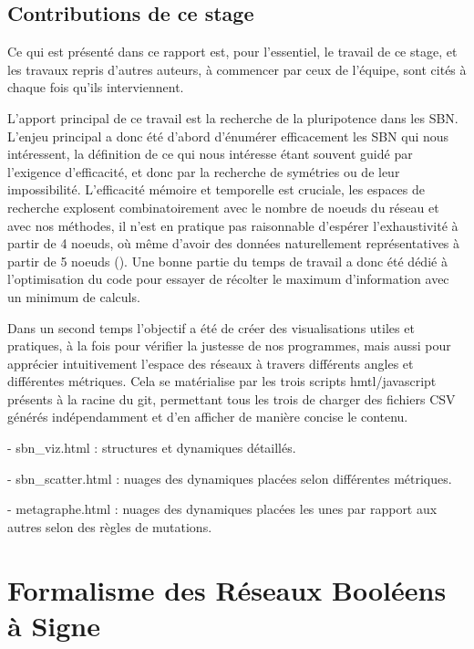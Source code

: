 \documentclass[12pt, a4paper]{article}
\begin{document}
\subsection{Contributions de ce stage}

Ce qui est présenté dans ce rapport est, pour l'essentiel, le travail de ce stage, et les travaux repris d'autres auteurs, à commencer par ceux de l'équipe, sont cités à chaque fois qu'ils interviennent.

L'apport principal de ce travail est la recherche de la pluripotence dans les SBN. L'enjeu principal a donc été d'abord d'énumérer efficacement les SBN qui nous intéressent, la définition de ce qui nous intéresse étant souvent guidé par l'exigence d'efficacité, et donc par la recherche de symétries ou de leur impossibilité. L'efficacité mémoire et temporelle est cruciale, les espaces de recherche explosent combinatoirement avec le nombre de noeuds du réseau et avec nos méthodes, il n'est en pratique pas raisonnable d'espérer l'exhaustivité à partir de 4 noeuds, où même d'avoir des données naturellement représentatives à partir de 5 noeuds (). Une bonne partie du temps de travail a donc été dédié à l'optimisation du code pour essayer de récolter le maximum d'information avec un minimum de calculs.  

Dans un second temps l'objectif a été de créer des visualisations utiles et pratiques, à la fois pour vérifier la justesse de nos programmes, mais aussi pour apprécier intuitivement l'espace des réseaux à travers différents angles et différentes métriques. Cela se matérialise par les trois scripts hmtl/javascript présents à la racine du git, permettant tous les trois de charger des fichiers CSV générés indépendamment et d'en afficher de manière concise le contenu. 

- sbn\_viz.html : structures et dynamiques détaillés.

- sbn\_scatter.html : nuages des dynamiques placées selon différentes métriques.

- metagraphe.html : nuages des dynamiques placées les unes par rapport aux autres selon des règles de mutations.


\section{Formalisme des Réseaux Booléens à Signe}
\label{sec:formalisme}
\end{document}
